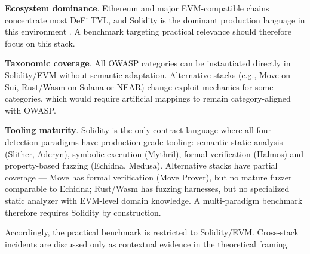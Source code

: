 \textbf{Ecosystem dominance}. Ethereum and major EVM-compatible chains concentrate most DeFi TVL, and Solidity is the dominant production language in this environment \cite{sciencedirect_defi_2025}. A benchmark targeting practical relevance should therefore focus on this stack.

\textbf{Taxonomic coverage}. All OWASP categories can be instantiated directly in Solidity/EVM without semantic adaptation. Alternative stacks (e.g., Move on Sui, Rust/Wasm on Solana or NEAR) change exploit mechanics for some categories, which would require artificial mappings to remain category-aligned with OWASP.

\textbf{Tooling maturity}. Solidity is the only contract language where all four detection paradigms have production-grade tooling: semantic static analysis (Slither, Aderyn), symbolic execution (Mythril), formal verification (Halmos) and property-based fuzzing (Echidna, Medusa). Alternative stacks have partial coverage — Move has formal verification (Move Prover), but no mature fuzzer comparable to Echidna; Rust/Wasm has fuzzing harnesses, but no specialized static analyzer with EVM-level domain knowledge. A multi-paradigm benchmark therefore requires Solidity by construction.

Accordingly, the practical benchmark is restricted to Solidity/EVM. Cross-stack incidents are discussed only as contextual evidence in the theoretical framing.